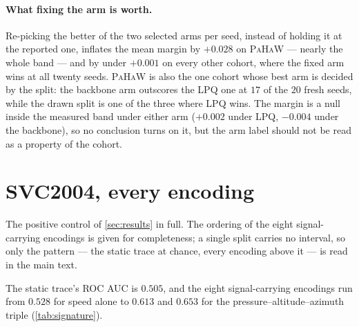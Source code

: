 \documentclass{article}
\begin{document}
\paragraph{What fixing the arm is worth.} Re-picking the better of the two selected arms per seed,
instead of holding it at the reported one, inflates the mean margin by $+0.028$ on \textsc{PaHaW}
--- nearly the whole band --- and by under $+0.001$ on every other cohort, where the fixed arm wins
at all twenty seeds. \textsc{PaHaW} is also the one cohort whose best arm is decided by the split:
the backbone arm outscores the LPQ one at $17$ of the $20$ fresh seeds, while the drawn split is
one of the three where LPQ wins. The margin is a null inside the measured band under either arm
($+0.002$ under LPQ, $-0.004$ under the backbone), so no conclusion turns on it, but the arm label
should not be read as a property of the cohort.

\section{SVC2004, every encoding}
\label{sec:signature-appendix}

The positive control of \cref{sec:results} in full. The ordering of the eight signal-carrying
encodings is given for completeness; a single split carries no interval, so only the pattern ---
the static trace at chance, every encoding above it --- is read in the main text.

The static trace's ROC AUC is $0.505$, and the eight signal-carrying encodings run from $0.528$ for
speed alone to $0.613$ and $0.653$ for the pressure--altitude--azimuth triple
(\cref{tab:signature}).


\end{document}
